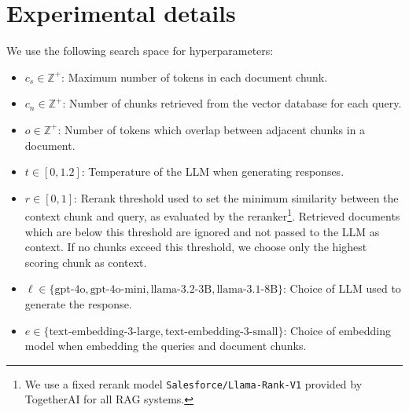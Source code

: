 \section{Experimental details}
\label{appendix:experiments}

We use the following search space for hyperparameters:
\begin{itemize}
    \item $c_s \in \mathbb{Z}^+$: Maximum number of tokens in each document chunk.
    \item $c_n \in \mathbb{Z}^+$: Number of chunks retrieved from the vector database for each query.
    \item $o \in \mathbb{Z}^+$: Number of tokens which overlap between adjacent chunks in a document.
    \item $t \in [0,1.2]$: Temperature of the LLM when generating responses.
    \item $r \in [0, 1]$: Rerank threshold used to set the minimum similarity between the context chunk and query, as evaluated by the reranker\footnote{We use a fixed rerank model \texttt{Salesforce/Llama-Rank-V1} provided by TogetherAI for all RAG systems.}. Retrieved documents which are below this threshold are ignored and not passed to the LLM as context. If no chunks exceed this threshold, we choose only the highest scoring chunk as context.
    \item $\ell \in \{\text{gpt-4o}, \text{gpt-4o-mini}, \text{llama-3.2-3B}, \text{llama-3.1-8B}\}$: Choice of LLM used to generate the response.
    \item $e \in \{\text{text-embedding-3-large},\text{text-embedding-3-small}
    \}$: Choice of embedding model when embedding the queries and document chunks.
\end{itemize}